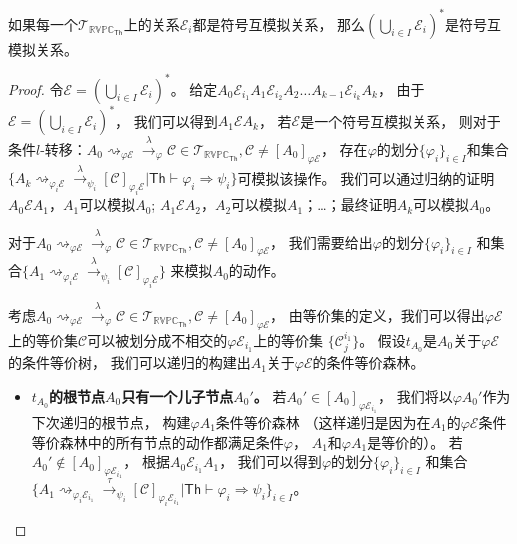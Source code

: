 \begin{lemma}\label{lemma:closure}
   如果每一个$\mathcal{T}_{\mathbb{RVPC}_{\mathsf{Th}}}$上的关系$\mathcal{E}_i$都是符号互模拟关系，
   那么$(\bigcup_{i\in I}\mathcal{E}_i)^*$是符号互模拟关系。
\end{lemma}
\begin{proof}
   令$\mathcal{E}=(\bigcup_{i\in I}\mathcal{E}_i)^*$。
   给定$A_0\mathcal{E}_{i_1}A_1\mathcal{E}_{i_2}A_2\dots A_{k-1}\mathcal{E}_{i_k} A_k$，
   由于$\mathcal{E}=(\bigcup_{i\in I}\mathcal{E}_{i})^*$，
   我们可以得到$A_1\mathcal{E}A_k$，
   若$\mathcal{E}$是一个符号互模拟关系，
   则对于条件$l$-转移：$A_0\rightsquigarrow_{\varphi\mathcal{E}}\stackrel{\lambda}{\rightarrow}_{\varphi} \mathcal{C}\in \mathcal{T}_{\mathbb{RVPC}_{\mathsf{Th}}},\mathcal{C}\neq [A_0]_{\varphi\mathcal{E}}$，
   存在$\varphi$的划分$\{\varphi_i\}_{i\in I}$和集合
   $\{A_k\rightsquigarrow_{\varphi_i\mathcal{E}}\stackrel{\lambda}{\rightarrow}_{\psi_i}[\mathcal{C}]_{\varphi_i\mathcal{E}}|\mathsf{Th}\vdash \varphi_i\Rightarrow\psi_i\}$可模拟该操作。
   我们可以通过归纳的证明$A_0\mathcal{E}A_1$，$A_1$可以模拟$A_0$;
   $A_1\mathcal{E}A_2$，$A_2$可以模拟$A_1$；\dots；最终证明$A_k$可以模拟$A_0$。

   对于$A_0\rightsquigarrow_{\varphi\mathcal{E}}\stackrel{\lambda}{\rightarrow}_{\varphi} \mathcal{C}\in \mathcal{T}_{\mathbb{RVPC}_{\mathsf{Th}}},\mathcal{C}\neq [A_0]_{\varphi\mathcal{E}}$，
   我们需要给出$\varphi$的划分$\{\varphi_i\}_{i\in I}$
   和集合$\{A_1\rightsquigarrow_{\varphi_i\mathcal{E}}\stackrel{\lambda}{\rightarrow}_{\psi_i}[\mathcal{C}]_{\varphi_i\mathcal{E}}\}$
   来模拟$A_0$的动作。

   考虑$A_0\rightsquigarrow_{\varphi\mathcal{E}}\stackrel{\lambda}{\rightarrow}_{\varphi} \mathcal{C}\in \mathcal{T}_{\mathbb{RVPC}_{\mathsf{Th}}},\mathcal{C}\neq [A_0]_{\varphi\mathcal{E}}$，
   由等价集的定义，我们可以得出$\varphi\mathcal{E}$上的等价集$\mathcal{C}$可以被划分成不相交的$\varphi\mathcal{E}_{i_1}$上的等价集
   $\{\mathcal{C}_j^{i_1}\}$。
   假设$t_{A_0}$是$A_0$关于$\varphi\mathcal{E}$的条件等价树，
   我们可以递归的构建出$A_1$关于$\varphi\mathcal{E}$的条件等价森林。

   \begin{itemize}
      \item {
         \textbf{$t_{A_0}$的根节点$A_0$只有一个儿子节点$A_0'$。}
         若$A_0'\in[A_0]_{\varphi\mathcal{E}_{i_1}}$，
         我们将以$\varphi A_0'$作为下次递归的根节点，
         构建$\varphi A_1$条件等价森林
         （这样递归是因为在$A_1$的$\varphi\mathcal{E}$条件等价森林中的所有节点的动作都满足条件$\varphi$，
         $A_1$和$\varphi A_1$是等价的）。
         若$A_0'\notin[A_0]_{\varphi\mathcal{E}_{i_1}}$，
         根据$A_0\mathcal{E}_{i_1}A_1$，
         我们可以得到$\varphi$的划分$\{\varphi_i\}_{i\in I}$
         和集合$\{A_1\rightsquigarrow_{\varphi_i\mathcal{E}_{i_1}}\stackrel{\tau}{\rightarrow}_{\psi_i}[\mathcal{C}]_{\varphi_i\mathcal{E}_{i_1}}|\mathsf{Th}\vdash \varphi_i\Rightarrow \psi_i\}_{i\in I}$。
         
}
\end{itemize}
\end{proof}
